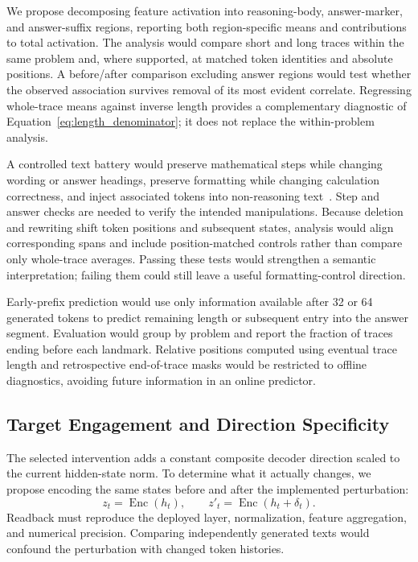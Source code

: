 We propose decomposing feature activation into reasoning-body, answer-marker, and answer-suffix regions, reporting both region-specific means and contributions to total activation.
The analysis would compare short and long traces within the same problem and, where supported, at matched token identities and absolute positions.
A before/after comparison excluding answer regions would test whether the observed association survives removal of its most evident correlate.
Regressing whole-trace means against inverse length provides a complementary diagnostic of Equation~\ref{eq:length_denominator}; it does not replace the within-problem analysis.

A controlled text battery would preserve mathematical steps while changing wording or answer headings, preserve formatting while changing calculation correctness, and inject associated tokens into non-reasoning text~\citep{ma2026reasoning}.
Step and answer checks are needed to verify the intended manipulations.
Because deletion and rewriting shift token positions and subsequent states, analysis would align corresponding spans and include position-matched controls rather than compare only whole-trace averages.
Passing these tests would strengthen a semantic interpretation; failing them could still leave a useful formatting-control direction.

Early-prefix prediction would use only information available after 32 or 64 generated tokens to predict remaining length or subsequent entry into the answer segment.
Evaluation would group by problem and report the fraction of traces ending before each landmark.
Relative positions computed using eventual trace length and retrospective end-of-trace masks would be restricted to offline diagnostics, avoiding future information in an online predictor.

\subsection{Target Engagement and Direction Specificity}
\label{sec:sae_engagement}

The selected intervention adds a constant composite decoder direction scaled to the current hidden-state norm.
To determine what it actually changes, we propose encoding the same states before and after the implemented perturbation:
\begin{equation}
  z_t=\operatorname{Enc}(h_t),\qquad
  z'_t=\operatorname{Enc}(h_t+\delta_t).
\label{eq:feature_readback}
\end{equation}
Readback must reproduce the deployed layer, normalization, feature aggregation, and numerical precision.
Comparing independently generated texts would confound the perturbation with changed token histories.

